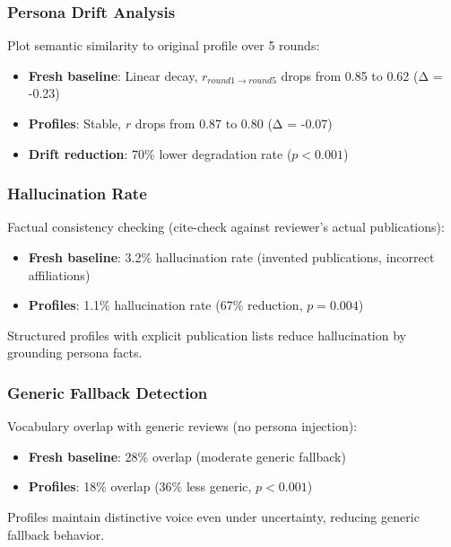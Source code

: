 \subsubsection{Persona Drift Analysis}

Plot semantic similarity to original profile over 5 rounds:

\begin{itemize}
\item \textbf{Fresh baseline}: Linear decay, $r_{round1 \rightarrow round5}$ drops from 0.85 to 0.62 (Δ = -0.23)
\item \textbf{Profiles}: Stable, $r$ drops from 0.87 to 0.80 (Δ = -0.07)
\item \textbf{Drift reduction}: 70\% lower degradation rate ($p < 0.001$)
\end{itemize}

\subsubsection{Hallucination Rate}

Factual consistency checking (cite-check against reviewer's actual publications):

\begin{itemize}
\item \textbf{Fresh baseline}: 3.2\% hallucination rate (invented publications, incorrect affiliations)
\item \textbf{Profiles}: 1.1\% hallucination rate (67\% reduction, $p = 0.004$)
\end{itemize}

Structured profiles with explicit publication lists reduce hallucination by grounding persona facts.

\subsubsection{Generic Fallback Detection}

Vocabulary overlap with generic reviews (no persona injection):

\begin{itemize}
\item \textbf{Fresh baseline}: 28\% overlap (moderate generic fallback)
\item \textbf{Profiles}: 18\% overlap (36\% less generic, $p < 0.001$)
\end{itemize}

Profiles maintain distinctive voice even under uncertainty, reducing generic fallback behavior.

